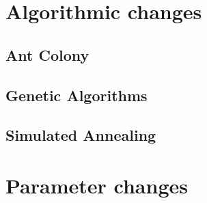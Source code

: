 \section{Algorithmic changes}
\label{sec:algorithmicChanges}

\subsection{Ant Colony}
\label{subsec:antColonyImplementation}

\subsection{Genetic Algorithms}
\label{subsec:geneticAlgorithmsImplementation}

\subsection{Simulated Annealing}
\label{subsec:simulatedAnnealingImplementation}

\section{Parameter changes}
\label{sec:parameterChanges}

